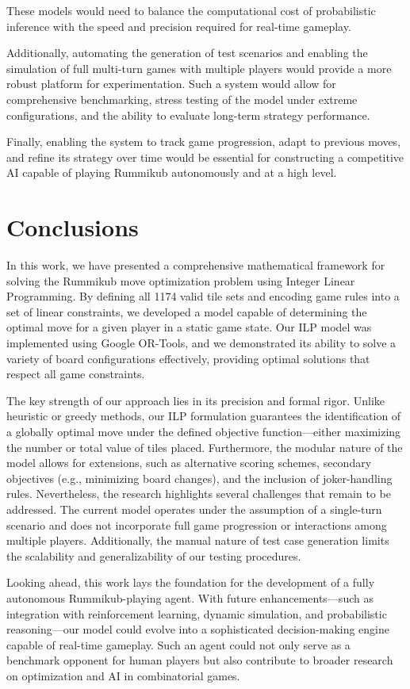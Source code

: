 \documentclass[11pt,letterpaper]{article}
\begin{document}
These models would need to balance the computational cost of probabilistic inference with the speed and precision required for real-time gameplay.

Additionally, automating the generation of test scenarios and enabling the simulation of full multi-turn games with multiple players would provide a more robust platform for experimentation. Such a system would allow for comprehensive benchmarking, stress testing of the model under extreme configurations, and the ability to evaluate long-term strategy performance.

Finally, enabling the system to track game progression, adapt to previous moves, and refine its strategy over time would be essential for constructing a competitive AI capable of playing Rummikub autonomously and at a high level.


\section*{Conclusions}
In this work, we have presented a comprehensive mathematical framework for solving the Rummikub move optimization problem using Integer Linear Programming. By defining all 1174 valid tile sets and encoding game rules into a set of linear constraints, we developed a model capable of determining the optimal move for a given player in a static game state. Our ILP model was implemented using Google OR-Tools, and we demonstrated its ability to solve a variety of board configurations effectively, providing optimal solutions that respect all game constraints.

The key strength of our approach lies in its precision and formal rigor. Unlike heuristic or greedy methods, our ILP formulation guarantees the identification of a globally optimal move under the defined objective function—either maximizing the number or total value of tiles placed. Furthermore, the modular nature of the model allows for extensions, such as alternative scoring schemes, secondary objectives (e.g., minimizing board changes), and the inclusion of joker-handling rules.
Nevertheless, the research highlights several challenges that remain to be addressed. The current model operates under the assumption of a single-turn scenario and does not incorporate full game progression or interactions among multiple players. Additionally, the manual nature of test case generation limits the scalability and generalizability of our testing procedures.

Looking ahead, this work lays the foundation for the development of a fully autonomous Rummikub-playing agent. With future enhancements—such as integration with reinforcement learning, dynamic simulation, and probabilistic reasoning—our model could evolve into a sophisticated decision-making engine capable of real-time gameplay. Such an agent could not only serve as a benchmark opponent for human players but also contribute to broader research on optimization and AI in combinatorial games.
\end{document}
